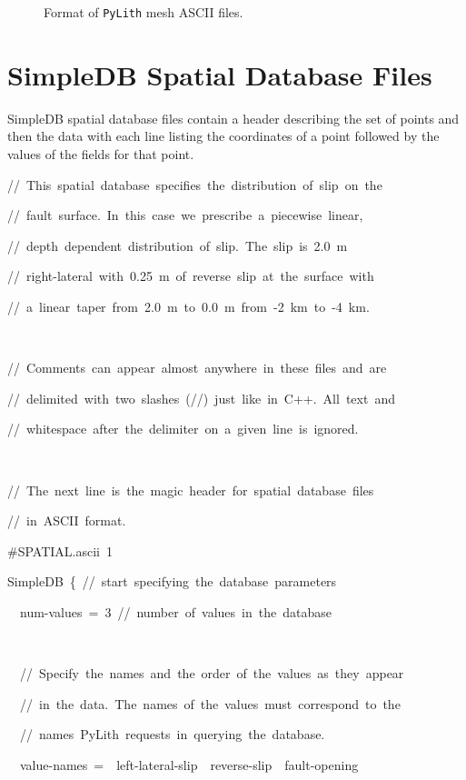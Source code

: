 \begin{figure}[H]
\caption{Format of \texttt{PyLith} mesh ASCII files.\label{fig:meshioascii:format}}
\end{figure}



\section{\label{sec:Spatialdata:SimpleIOAscii}SimpleDB Spatial Database Files}

SimpleDB spatial database files contain a header describing the set
of points and then the data with each line listing the coordinates
of a point followed by the values of the fields for that point. 
\begin{lyxcode}
//~This~spatial~database~specifies~the~distribution~of~slip~on~the

//~fault~surface.~In~this~case~we~prescribe~a~piecewise~linear,~

//~depth~dependent~distribution~of~slip.~The~slip~is~2.0~m~

//~right-lateral~with~0.25~m~of~reverse~slip~at~the~surface~with

//~a~linear~taper~from~2.0~m~to~0.0~m~from~-2~km~to~-4~km.

~

//~Comments~can~appear~almost~anywhere~in~these~files~and~are

//~delimited~with~two~slashes~(//)~just~like~in~C++.~All~text~and~

//~whitespace~after~the~delimiter~on~a~given~line~is~ignored.

~

//~The~next~line~is~the~magic~header~for~spatial~database~files~

//~in~ASCII~format.

\#SPATIAL.ascii~1

SimpleDB~\{~//~start~specifying~the~database~parameters

~~num-values~=~3~//~number~of~values~in~the~database

~

~~//~Specify~the~names~and~the~order~of~the~values~as~they~appear~

~~//~in~the~data.~The~names~of~the~values~must~correspond~to~the~

~~//~names~PyLith~requests~in~querying~the~database.

~~value-names~=~~left-lateral-slip~~reverse-slip~~fault-opening


\end{lyxcode}
